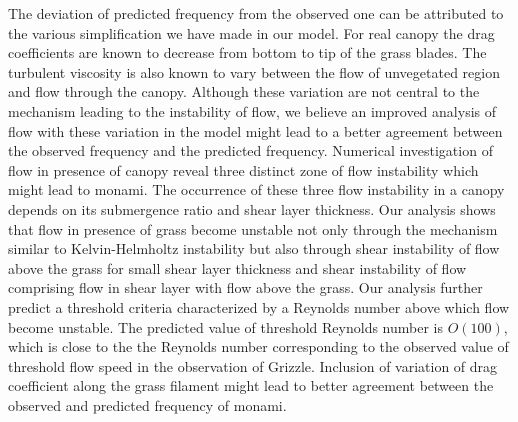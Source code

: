 \documentclass[aps,prl,twocolumn,showpacs,superscriptaddress,groupedaddress,10pt]{revtex4-1}  %
\begin{document}
The deviation of predicted frequency from the observed one can be attributed to the various simplification we have made in our model. For real canopy the drag coefficients are known to
decrease from bottom to tip of the grass blades. The turbulent viscosity is also known to vary between the flow of unvegetated region and flow through the canopy. Although these variation
are not central to the mechanism leading to the instability of flow, we believe an improved analysis of flow with these variation in the model might lead to a better agreement between the
observed frequency and the predicted frequency.   
\newline
Numerical investigation of flow in presence of canopy reveal three distinct zone of flow instability which might lead to monami. The occurrence of these three flow instability in a canopy
depends on its submergence ratio and shear layer thickness. Our analysis shows that flow in presence of grass become unstable not only through the mechanism similar to Kelvin-Helmholtz
instability but also through shear instability of flow above the grass for small shear layer thickness and shear instability of flow comprising flow in shear layer with flow above the grass.
Our analysis further predict a threshold criteria characterized by a Reynolds number above which flow become unstable. The predicted value of threshold Reynolds number is $O(100)$, which is 
close to the the Reynolds number corresponding to the observed value of threshold flow speed in the observation of Grizzle. Inclusion of variation of drag coefficient along the grass filament
might lead to better agreement between the observed and predicted frequency of monami. 
{}

\end{document}
